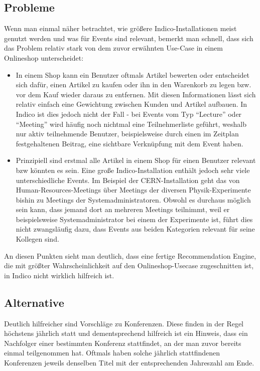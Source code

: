 \subsection{Probleme}

Wenn man einmal näher betrachtet, wie größere Indico-Installationen meist genutzt werden und was für
Events sind relevant, bemerkt man schnell, dass sich das Problem relativ stark von dem zuvor
erwähnten Use-Case in einem Onlineshop unterscheidet:

\begin{itemize}

\item In einem Shop kann ein Benutzer oftmals Artikel bewerten oder entscheidet sich dafür, einen
Artikel zu kaufen oder ihn in den Warenkorb zu legen bzw. vor dem Kauf wieder daraus zu entfernen.
Mit diesen Informationen lässt sich relativ einfach eine Gewichtung zwischen Kunden und Artikel
aufbauen. In Indico ist dies jedoch nicht der Fall - bei Events vom Typ \enquote{Lecture} oder
\enquote{Meeting} wird häufig noch nichtmal eine Teilnehmerliste geführt, weshalb nur aktiv
teilnehmende Benutzer, beispielsweise durch einen im Zeitplan festgehaltenen Beitrag, eine sichtbare
Verknüpfung mit dem Event haben.

\item Prinzipiell sind erstmal alle Artikel in einem Shop für einen Benutzer relevant bzw könnten es
sein. Eine große Indico-Installation enthält jedoch sehr viele unterschiedliche Events. Im Beispiel
der CERN-Installation geht das von Human-Resources-Meetings über Meetings der diversen
Physik-Experimente bishin zu Meetings der Systemadministratoren. Obwohl es durchaus möglich sein
kann, dass jemand dort an mehreren Meetings teilnimmt, weil er beispielsweise Systemadministrator
bei einem der Experimente ist, führt dies nicht zwangsläufig dazu, dass Events aus beiden Kategorien
relevant für seine Kollegen sind.

\end{itemize}

An diesen Punkten sieht man deutlich, dass eine fertige Recommendation Engine, die mit größter
Wahrscheinlichkeit auf den Onlineshop-Usecase zugeschnitten ist, in Indico nicht wirklich hilfreich
ist.


\subsection{Alternative}

Deutlich hilfreicher sind Vorschläge zu Konferenzen. Diese finden in der Regel höchstens jährlich
statt und dementsprechend hilfreich ist ein Hinweis, dass ein Nachfolger einer bestimmten Konferenz
stattfindet, an der man zuvor bereits einmal teilgenommen hat. Oftmals haben solche jährlich
stattfindenen Konferenzen jeweils denselben Titel mit der entsprechenden Jahreszahl am Ende.

